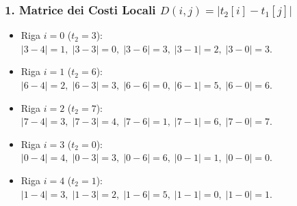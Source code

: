 \subsubsection{1. Matrice dei Costi Locali $D(i,j) = |t_2[i] - t_1[j]|$}
\begin{itemize}
    \item Riga $i=0$ ($t_2=3$): $|3-4|=1, \; |3-3|=0, \; |3-6|=3, \; |3-1|=2, \; |3-0|=3$.
    \item Riga $i=1$ ($t_2=6$): $|6-4|=2, \; |6-3|=3, \; |6-6|=0, \; |6-1|=5, \; |6-0|=6$.
    \item Riga $i=2$ ($t_2=7$): $|7-4|=3, \; |7-3|=4, \; |7-6|=1, \; |7-1|=6, \; |7-0|=7$.
    \item Riga $i=3$ ($t_2=0$): $|0-4|=4, \; |0-3|=3, \; |0-6|=6, \; |0-1|=1, \; |0-0|=0$.
    \item Riga $i=4$ ($t_2=1$): $|1-4|=3, \; |1-3|=2, \; |1-6|=5, \; |1-1|=0, \; |1-0|=1$.
\end{itemize}

